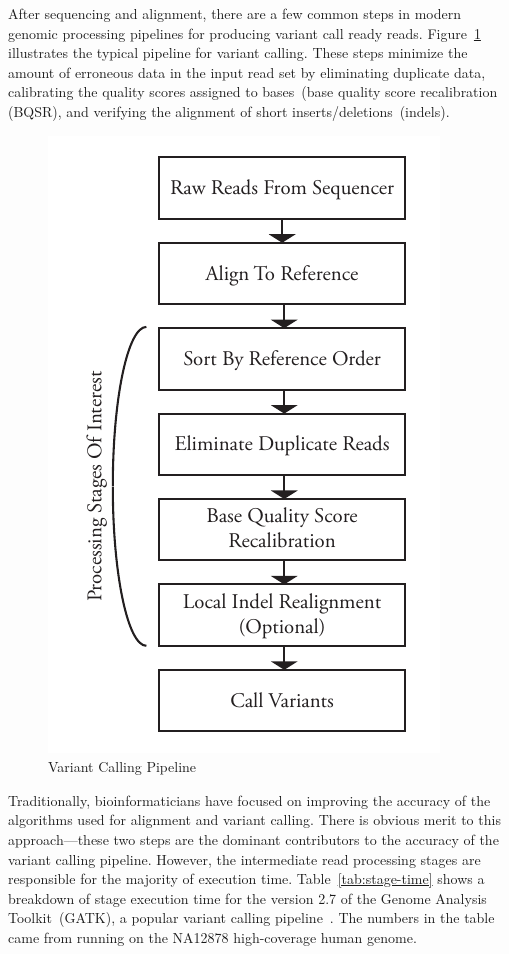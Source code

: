 \documentclass[10pt,twocolumn]{article}
\theoremstyle{plain}
\begin{document}
After sequencing and alignment, there are a few common steps in modern genomic processing pipelines for producing
variant call ready reads. Figure~\ref{fig:pipeline} illustrates the typical pipeline for variant calling. These steps minimize the amount of erroneous data in the input read set by eliminating duplicate data,
calibrating the quality scores assigned to bases~(base quality score
recalibration (BQSR), and verifying the alignment of short inserts/deletions~(indels).

\begin{figure}[h]
\begin{center}
\includegraphics[width=0.9\linewidth]{pipeline.pdf}
\end{center}
\caption{Variant Calling Pipeline}
\label{fig:pipeline}
\end{figure}

Traditionally, bioinformaticians have focused on improving the accuracy of the algorithms used for alignment and variant
calling. There is obvious merit to this approach---these two steps are the dominant contributors to the accuracy of the variant
calling pipeline. However, the intermediate read processing stages are responsible for the majority of execution time. Table~\ref{tab:stage-time} shows a
breakdown of stage execution time for the version 2.7 of the Genome Analysis
Toolkit~(GATK), a popular variant calling pipeline~\cite{mckenna10}. The numbers in the table came from running on
the NA12878 high-coverage human genome.
\end{document}
